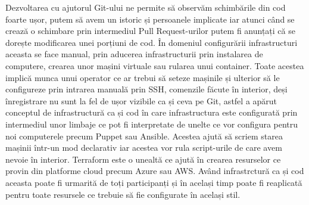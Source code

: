Dezvoltarea cu ajutorul Git-ului ne permite să observăm schimbările din cod foarte ușor, 
putem să avem un istoric și persoanele implicate iar atunci când se crează o schimbare
prin intermediul Pull Request-urilor putem fi anunțați că se dorește modificarea unei porțiuni de cod.
În domeniul configurării infrastructuri aceasta se face manual, prin aducerea infrastructurii prin
instalarea de computere, crearea unor mașini virtuale sau rularea unui container. Toate acestea
implică munca unui operator ce ar trebui să seteze mașinile și ulterior să le configureze prin intrarea
manuală prin SSH, comenzile făcute în interior, deși înregistrare nu sunt la fel de ușor
vizibile ca și ceva pe Git, astfel a apărut conceptul de infrastructură ca și cod în care
infrastructura este configurată prin intermediul unor limbaje ce pot fi interpretate de 
unelte ce vor configura pentru noi computerele precum Puppet sau Ansible. Acestea ajută să
scriem starea mașinii într-un mod declarativ iar acestea vor rula script-urile de care avem nevoie
în interior. Terraform este o unealtă ce ajută în crearea resurselor ce provin din platforme cloud
precum Azure sau AWS. Având infrastrctură ca și cod aceasta poate fi urmarită de toți participanți și 
în același timp poate fi reaplicată pentru toate resursele ce trebuie să fie configurate în același
stil.

